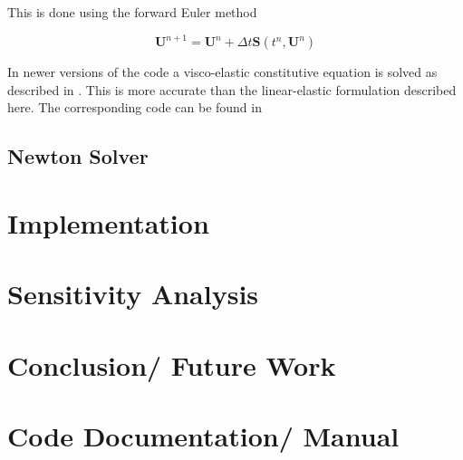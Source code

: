 \documentclass[a4paper, oneside]{discothesis}
\begin{document}
This is done using the forward Euler method

\begin{equation}
	\mathbf{U}^{n+1}=\mathbf{U}^n + \Delta t \mathbf{S}\left(t^n, \mathbf{U}^n\right)
\end{equation}

In newer versions of the code a visco-elastic constitutive equation is solved as described in \cite{ALASTRUEY20112250}.
This is more accurate than the linear-elastic formulation described here.
The corresponding code can be found in 

\section{Newton Solver}

\chapter{Implementation}
\chapter{Sensitivity Analysis}
\chapter{Conclusion/ Future Work}





\appendix
\chapter{Code Documentation/ Manual} 
\end{document}
